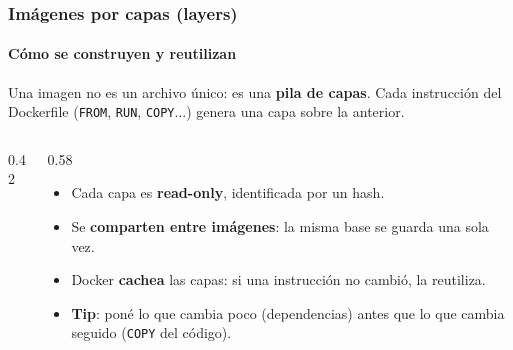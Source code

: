 
\begin{frame}
    \frametitle{Imágenes por capas (layers)}
    \framesubtitle{Cómo se construyen y reutilizan}

    Una imagen no es un archivo único: es una \textbf{pila de capas}. Cada instrucción del Dockerfile (\texttt{FROM}, \texttt{RUN}, \texttt{COPY}...) genera una capa sobre la anterior.

    \vspace{0.2cm}
    \begin{columns}[T]
        \begin{column}{0.42\textwidth}
            \begin{center}
            \end{center}
        \end{column}
        \begin{column}{0.58\textwidth}
            \footnotesize
            \begin{itemize}
                \item Cada capa es \textbf{read-only}, identificada por un hash.
                \item Se \textbf{comparten entre imágenes}: la misma base se guarda una sola vez.
                \item Docker \textbf{cachea} las capas: si una instrucción no cambió, la reutiliza.
                \item \textbf{Tip}: poné lo que cambia poco (dependencias) antes que lo que cambia seguido (\texttt{COPY} del código).
            \end{itemize}
        \end{column}
    \end{columns}
\end{frame}

